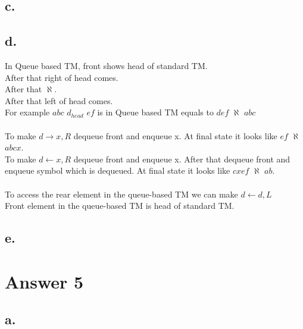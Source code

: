 \documentclass[12pt]{article}
\begin{document}
\subsection*{c.}



\subsection*{d.}

In Queue based TM, front shows head of standard TM.\\
After that right of head comes.\\
After that $\aleph$.\\
After that left of head comes.\\
For example $abc$ $d_{head}$ $ef$ is in Queue based TM equals to $def$ $\aleph$ $abc$\\\\
To make $d \rightarrow x, R$ dequeue front and enqueue x. At final state it looks like $ef$ $\aleph$ $abcx$.\\
To make $d \leftarrow x, R$ dequeue front and enqueue x. After that dequeue front and enqueue symbol which is dequeued. At final state it looks like $cxef$ $\aleph$ $ab$.\\\\
To access the rear element in the queue-based TM we can make $d \leftarrow d, L$\\
Front element in the queue-based TM is head of standard TM.

\subsection*{e.}




\section*{Answer 5}


\subsection*{a.}
\end{document}
